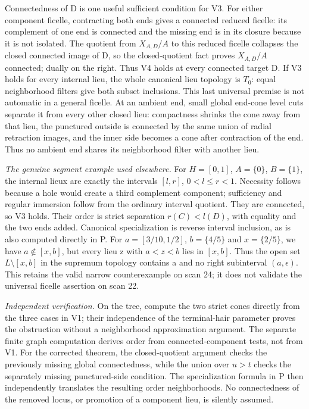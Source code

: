 Connectedness of D is one useful sufficient condition for V3. For either component ficelle, contracting both ends gives a connected reduced ficelle: its complement of one end is connected and the missing end is in its closure because it is not isolated. The quotient from $X_{A,D}/A$ to this reduced ficelle collapses the closed connected image of D, so the closed-quotient fact proves $X_{A,D}/A$ connected; dually on the right. Thus V4 holds at every connected target D. If V3 holds for every internal lieu, the whole canonical lieu topology is $T_0$: equal neighborhood filters give both subset inclusions. This last universal premise is not automatic in a general ficelle. At an ambient end, small global end-cone level cuts separate it from every other closed lieu: compactness shrinks the cone away from that lieu, the punctured outside is connected by the same union of radial retraction images, and the inner side becomes a cone after contraction of the end. Thus no ambient end shares its neighborhood filter with another lieu.

\emph{The genuine segment example used elsewhere.}
For $H=[0,1]$, $A=\{0\}$, $B=\{1\}$, the internal lieux are exactly the intervals $[l,r]$, $0<l\leq r<1$. Necessity follows because a hole would create a third complement component; sufficiency and regular immersion follow from the ordinary interval quotient. They are connected, so V3 holds. Their order is strict separation $r(C)<l(D)$, with equality and the two ends added. Canonical specialization is reverse interval inclusion, as is also computed directly in P. For $a=[3/10,1/2]$, $b=\{4/5\}$ and $x=\{2/5\}$, we have $a\notin[x,b]$, but every lieu z with $a<z<b$ lies in $[x,b]$. Thus the open set $L\setminus[x,b]$ in the supremum topology contains a and no right subinterval $(a,\epsilon)$. This retains the valid narrow counterexample on scan 24; it does not validate the universal ficelle assertion on scan 22.

\emph{Independent verification.} On the tree, compute the two strict cones directly from the three cases in V1; their independence of the terminal-hair parameter proves the obstruction without a neighborhood approximation argument. The separate finite graph computation derives order from connected-component tests, not from V1. For the corrected theorem, the closed-quotient argument checks the previously missing global connectedness, while the union over $u>t$ checks the separately missing punctured-side condition. The specialization formula in P then independently translates the resulting order neighborhoods. No connectedness of the removed locus, or promotion of a component lieu, is silently assumed.


